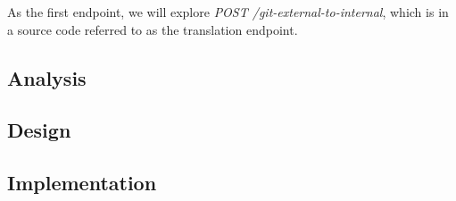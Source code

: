 \documentclass[../main.tex]{subfiles}
\begin{document}
As the first endpoint, we will explore \textit{POST /git-external-to-internal}, which is in a source code referred to as the translation endpoint.

\subsection{Analysis}
\label{subsection:translation-analysis}


\subsection{Design}


\subsection{Implementation}

\end{document}
